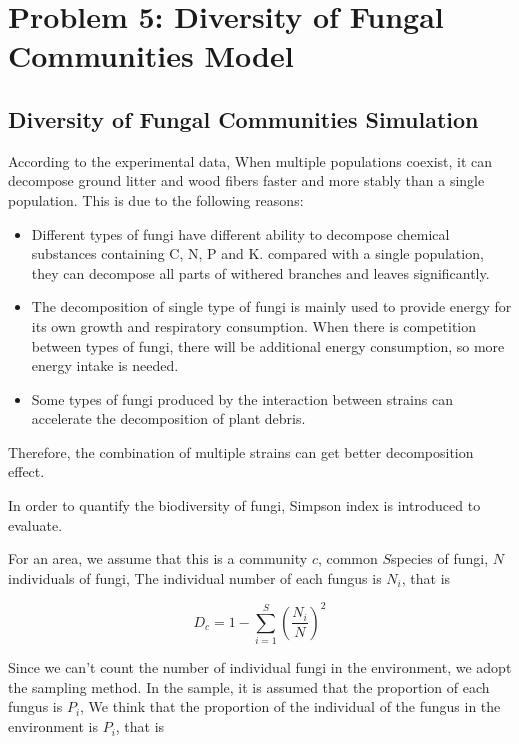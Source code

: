 \documentclass{mcmthesis}
\begin{document}
\section{Problem 5: Diversity of Fungal Communities Model}

\subsection{Diversity of Fungal Communities Simulation}

According to the experimental data\cite{maynard2019consistent}, When multiple populations coexist, it can decompose ground litter and wood fibers faster and more stably than a single population. This is due to the following reasons:

\begin{itemize}
  \item Different types of fungi have different ability to decompose chemical substances containing C, N, P and K. compared with a single population, they can decompose all parts of withered branches and leaves significantly.
  \item The decomposition of single type of fungi is mainly used to provide energy for its own growth and respiratory consumption. When there is competition between types of fungi, there will be additional energy consumption, so more energy intake is needed.
  \item Some types of fungi produced by the interaction between strains can accelerate the decomposition of plant debris.
\end{itemize}

Therefore, the combination of multiple strains can get better decomposition effect.

In order to quantify the biodiversity of fungi, Simpson index is introduced to evaluate.

For an area, we assume that this is a community $ c $, common $ S $species of fungi, $ N $individuals of fungi, The individual number of each fungus is $ N_i $, that is

\begin{equation}
  D_c=1-\sum_{i=1}^{S}\left(\frac{N_i}{N}\right)^{2}
\end{equation}

Since we can't count the number of individual fungi in the environment, we adopt the sampling method. In the sample, it is assumed that the proportion of each fungus is $ P_i $, We think that the proportion of the individual of the fungus in the environment is $ P_i $, that is
\end{document}
